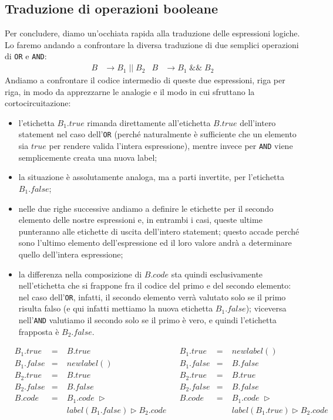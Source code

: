 \documentclass[class=book, crop=false, oneside, 12pt]{standalone}
\begin{document}
\subsection{Traduzione di operazioni booleane}
Per concludere, diamo un'occhiata rapida alla traduzione delle espressioni logiche. Lo faremo andando a confrontare la diversa traduzione di due semplici operazioni di \texttt{OR} e \texttt{AND}:
\begin{align*}
    B &\to B_1\; ||\; B_2 & B &\to B_1\; \&\&\; B_2 
\end{align*}
Andiamo a confrontare il codice intermedio di queste due espressioni, riga per riga, in modo da apprezzarne le analogie e il modo in cui sfruttano la cortocircuitazione:
\begin{itemize}
    \item l'etichetta \(B_1.true\) rimanda direttamente all'etichetta \(B.true\) dell'intero statement nel caso dell'\texttt{OR} (perché naturalmente è sufficiente che un elemento sia \(true\) per rendere valida l'intera espressione), mentre invece per \texttt{AND} viene semplicemente creata una nuova label;
    \item la situazione è assolutamente analoga, ma a parti invertite, per l'etichetta \(B_1.false\);
    \item nelle due righe successive andiamo a definire le etichette per il secondo elemento delle nostre espressioni e, in entrambi i casi, queste ultime punteranno alle etichette di uscita dell'intero statement; questo accade perché sono l'ultimo elemento dell'espressione ed il loro valore andrà a determinare quello dell'intera espressione;
    \item la differenza nella composizione di \(B.code\) sta quindi esclusivamente nell'etichetta che si frappone fra il codice del primo e del secondo elemento: nel caso dell'\texttt{OR}, infatti, il secondo elemento verrà valutato solo se il primo risulta falso (e qui infatti mettiamo la nuova etichetta \(B_1.false\)); viceversa nell'\texttt{AND} valutiamo il secondo solo se il primo è vero, e quindi l'etichetta frapposta è \(B_2.false\).
\end{itemize}
\begin{align*}
    &B_1.true &=\; &B.true & &B_1.true &=\; &newlabel() \\
    &B_1.false &=\; &newlabel() & &B_1.false &=\; &B.false \\
    &B_2.true &=\; &B.true & &B_2.true &=\; &B.true \\
    &B_2.false &=\; &B.false & &B_2.false &=\; &B.false \\
    &B.code &=\; &B_1.code\; \triangleright & &B.code &=\; &B_1.code\; \triangleright \\
    &&&label(B_1.false) \triangleright  B_2.code & &&&  label(B_1.true) \triangleright B_2.code
\end{align*}
\end{document}
